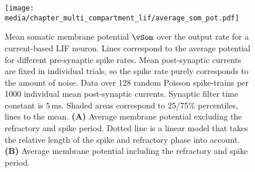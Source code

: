 \begin{figure}[p]
	\centering
	\texttt{[image: media/chapter\_multi\_compartment\_lif/average\_som\_pot.pdf]}%
	{\label{fig:avg_vsom_a}}%
	{\label{fig:avg_vsom_b}}%
	\caption[Mean somatic membrane potential over the neuron output rate]{Mean somatic membrane potential $\vSom$ over the output rate for a current-based LIF neuron. Lines correspond to the average potential for different pre-synaptic spike rates.
	Mean post-synaptic currents are fixed in individual trials, so the spike rate purely corresponds to the amount of noise.
	Data over 128 random Poisson spike-trains per 1000 individual mean post-synaptic currents.
	Synaptic filter time constant is $5\,\mathrm{ms}$. Shaded areas correspond to 25/75\% percentiles, lines to the mean. \textbf{(A)} Average membrane potential excluding the refractory and spike period. Dotted line is a  linear model that takes the relative length of the spike and refractory phase into account. \textbf{(B)} Average membrane potential including the refractory and spike period.}
	\label{fig:avg_vsom}
\end{figure}

